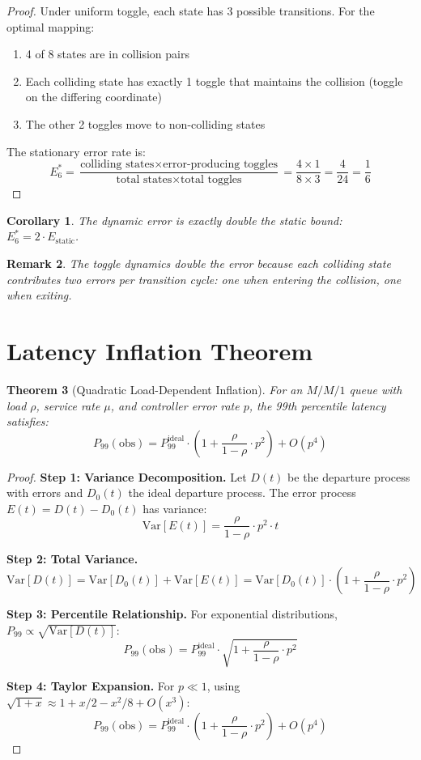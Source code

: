 \documentclass[11pt]{article}
\newtheorem{theorem}{Theorem}[section]
\newtheorem{corollary}[theorem]{Corollary}
\newtheorem{remark}[theorem]{Remark}
\begin{document}
\begin{proof}
Under uniform toggle, each state has 3 possible transitions. For the optimal mapping:
\begin{enumerate}
    \item 4 of 8 states are in collision pairs
    \item Each colliding state has exactly 1 toggle that maintains the collision (toggle on the differing coordinate)
    \item The other 2 toggles move to non-colliding states
\end{enumerate}

The stationary error rate is:
$$E_6^* = \frac{\text{colliding states} \times \text{error-producing toggles}}{\text{total states} \times \text{total toggles}} = \frac{4 \times 1}{8 \times 3} = \frac{4}{24} = \frac{1}{6}$$
\end{proof}

\begin{corollary}
\label{cor:double}
The dynamic error is exactly double the static bound: $E_6^* = 2 \cdot E_{\text{static}}$.
\end{corollary}

\begin{remark}
The toggle dynamics double the error because each colliding state contributes two errors per transition cycle: one when entering the collision, one when exiting.
\end{remark}

\section{Latency Inflation Theorem}
\label{sec:inflation}

\begin{theorem}[Quadratic Load-Dependent Inflation]
\label{thm:inflation}
For an $M/M/1$ queue with load $\rho$, service rate $\mu$, and controller error rate $p$, the 99th percentile latency satisfies:
$$\boxed{P_{99}(\text{obs}) = P_{99}^{\text{ideal}} \cdot \left(1 + \frac{\rho}{1-\rho} \cdot p^2\right) + O(p^4)}$$
\end{theorem}

\begin{proof}
\textbf{Step 1: Variance Decomposition.} Let $D(t)$ be the departure process with errors and $D_0(t)$ the ideal departure process. The error process $E(t) = D(t) - D_0(t)$ has variance:
$$\text{Var}[E(t)] = \frac{\rho}{1-\rho} \cdot p^2 \cdot t$$

\textbf{Step 2: Total Variance.}
$$\text{Var}[D(t)] = \text{Var}[D_0(t)] + \text{Var}[E(t)] = \text{Var}[D_0(t)] \cdot \left(1 + \frac{\rho}{1-\rho} \cdot p^2\right)$$

\textbf{Step 3: Percentile Relationship.} For exponential distributions, $P_{99} \propto \sqrt{\text{Var}[D(t)]}$:
$$P_{99}(\text{obs}) = P_{99}^{\text{ideal}} \cdot \sqrt{1 + \frac{\rho}{1-\rho} \cdot p^2}$$

\textbf{Step 4: Taylor Expansion.} For $p \ll 1$, using $\sqrt{1+x} \approx 1 + x/2 - x^2/8 + O(x^3)$:
$$P_{99}(\text{obs}) = P_{99}^{\text{ideal}} \cdot \left(1 + \frac{\rho}{1-\rho} \cdot p^2\right) + O(p^4)$$
\end{proof}
\end{document}
